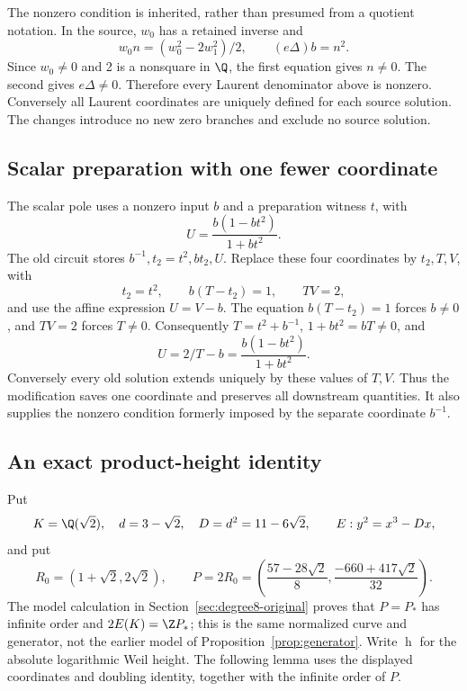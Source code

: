 The nonzero condition is inherited, rather than presumed from a quotient notation. In the source, $w_0$ has a retained inverse and
\[
 w_0n=(w_0^2-2w_1^2)/2,\qquad (e\Delta)b=n^2.
\]
Since $w_0\ne0$ and 2 is a nonsquare in $\Q$, the first equation gives $n\ne0$. The second gives $e\Delta\ne0$. Therefore every Laurent denominator above is nonzero. Conversely all Laurent coordinates are uniquely defined for each source solution. The changes introduce no new zero branches and exclude no source solution.

\subsection{Scalar preparation with one fewer coordinate}\label{subsec:v9-preparation}
The scalar pole uses a nonzero input $b$ and a preparation witness $t$, with
\[
 U=\frac{b(1-bt^2)}{1+bt^2}.
\]
The old circuit stores $b^{-1},t_2=t^2,bt_2,U$. Replace these four coordinates by $t_2,T,V$, with
\[
 t_2=t^2,\qquad b(T-t_2)=1,\qquad TV=2,
\]
and use the affine expression $U=V-b$. The equation $b(T-t_2)=1$ forces $b\ne0$, and $TV=2$ forces $T\ne0$. Consequently $T=t^2+b^{-1}$, $1+bt^2=bT\ne0$, and
\[
 U=2/T-b=\frac{b(1-bt^2)}{1+bt^2}.
\]
Conversely every old solution extends uniquely by these values of $T,V$. Thus the modification saves one coordinate and preserves all downstream quantities. It also supplies the nonzero condition formerly imposed by the separate coordinate $b^{-1}$.


\subsection{An exact product-height identity}\label{v9:sec:height}
Put
\[
 K=\Q(\sqrt2),\quad d=3-\sqrt2,\quad D=d^2=11-6\sqrt2,
 \qquad E:y^2=x^3-Dx,
\]
and put
\[
 R_0=(1+\sqrt2,2\sqrt2),\qquad
 P=2R_0=\left(\frac{57-28\sqrt2}{8},\frac{-660+417\sqrt2}{32}\right).
\]
The model calculation in Section~\ref{sec:degree8-original} proves that $P=P_*$ has infinite order and $2E(K)=\Z P_*$; this is the same normalized curve and generator, not the earlier model of Proposition~\ref{prop:generator}. Write $\operatorname{h}$ for the absolute logarithmic Weil height. The following lemma uses the displayed coordinates and doubling identity, together with the infinite order of $P$.

